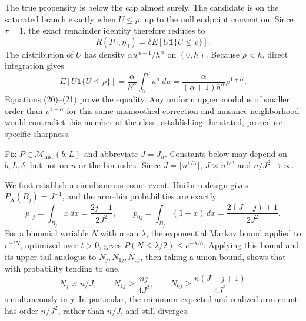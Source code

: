 The true propensity is below the cap almost surely.  The candidate is on the saturated branch exactly when \(U\le\rho\), up to the null endpoint convention.  Since \(\tau=1\), the exact remainder identity therefore reduces to
\begin{equation}
 R(P_{\mathrm{lf}},\eta_{\mathrm{lf}})
 =\delta E[U\mathbf1\{U\le\rho\}].                                                     \tag{20}
\end{equation}
The distribution of \(U\) has density \(\alpha u^{\alpha-1}/h^\alpha\) on \((0,h)\).  Because \(\rho<h\), direct integration gives
\begin{equation}
 E[U\mathbf1\{U\le\rho\}]
 =\frac{\alpha}{h^\alpha}\int_0^\rho u^\alpha\,du
 =\frac{\alpha}{(\alpha+1)h^\alpha}\rho^{1+\alpha}.                                   \tag{21}
\end{equation}
Equations (20)--(21) prove the equality.  Any uniform upper modulus of smaller order than \(\rho^{1+\alpha}\) for this same unsmoothed correction and nuisance neighborhood would contradict this member of the class, establishing the stated, procedure-specific sharpness.

Fix \(P\in\mathcal M_{\mathrm{hist}}(b,L)\) and abbreviate \(J=J_n\).  Constants below may depend on \(b,L,\delta\), but not on \(n\) or the bin index.  Since \(J=\lceil n^{1/3}\rceil\), \(J\asymp n^{1/3}\) and \(n/J^2\to\infty\).

We first establish a simultaneous count event.  Uniform design gives \(P_X(B_j)=J^{-1}\), and the arm--bin probabilities are exactly
\begin{equation}
 p_{1j}=\int_{B_j}x\,dx=\frac{2j-1}{2J^2},\qquad
 p_{0j}=\int_{B_j}(1-x)\,dx=\frac{2(J-j)+1}{2J^2}.                                      \tag{22}
\end{equation}
For a binomial variable \(N\) with mean \(\lambda\), the exponential Markov bound applied to \(e^{-tN}\), optimized over \(t>0\), gives
\(P(N\le\lambda/2)\le e^{-\lambda/8}\).  Applying this bound and its upper-tail analogue to \(N_j,N_{1j},N_{0j}\), then taking a union bound, shows that with probability tending to one,
\begin{equation}
 N_j\asymp n/J,\qquad
 N_{1j}\ge \frac{nj}{4J^2},\qquad
 N_{0j}\ge\frac{n(J-j+1)}{4J^2}                                                         \tag{23}
\end{equation}
simultaneously in \(j\).  In particular, the minimum expected and realized arm count has order \(n/J^2\), rather than \(n/J\), and still diverges.

